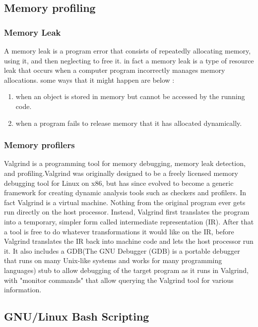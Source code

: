 \documentclass[titlepage]{article}
\begin{document}
\subsection {Memory profiling}
\subsubsection {Memory Leak}
A memory leak is a program error that consists of repeatedly allocating memory, using it, and then neglecting to free it.
\newline in fact  a memory leak is a type of resource leak that occurs when a computer program incorrectly manages memory allocations. some ways that it might happen are below :
\newpage
{}
\fancyhead[R]{}
\begin{enumerate}
\item{when an object is stored in memory but cannot be accessed by the running code. }
\item{when a program fails to release memory that it has allocated dynamically.}
\end{enumerate}
\subsubsection {Memory profilers}
Valgrind is a programming tool for memory debugging, memory leak detection, and profiling.\newline Valgrind was originally designed to be a freely licensed memory debugging tool for Linux on x86, but has since evolved to become a generic framework for creating dynamic analysis tools such as checkers and profilers.\newline
In fact Valgrind is a virtual machine. Nothing from the original program ever gets run directly on the host processor. Instead, Valgrind first translates the program into a temporary, simpler form called intermediate representation (IR). After that a tool is free to do whatever transformations it would like on the IR, before Valgrind translates the IR back into machine code and lets the host processor run it. It also includes a GDB(The GNU Debugger (GDB) is a portable debugger that runs on many Unix-like systems and works for many programming languages) stub to allow debugging of the target program as it runs in Valgrind, with "monitor commands" that allow querying the Valgrind tool for various information.
\subsection{GNU/Linux Bash Scripting}
\end{document}
